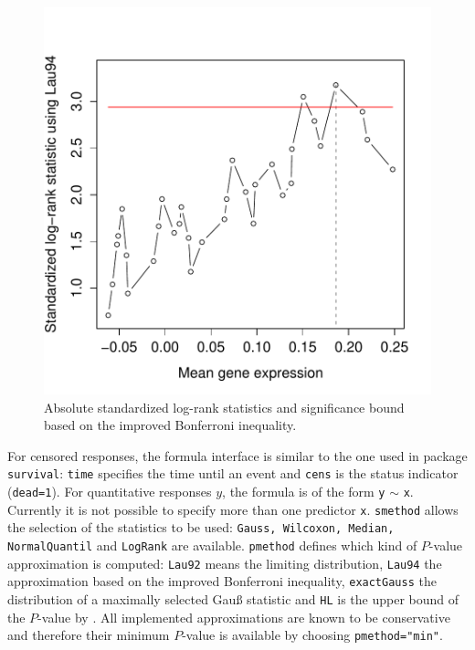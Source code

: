 \documentclass{article}
\renewcommand{\baselinestretch}{1.5}
\begin{document}
\begin{figure}[t]
\begin{center}   
\includegraphics{maxstat-DLBCL-fig}
\caption{Absolute standardized log-rank statistics and 
significance bound based on the
improved Bonferroni inequality. \label{stat}}
\end{center}
\end{figure}

\normalsize
\renewcommand{\baselinestretch}{1.5}

For censored responses, the formula interface is similar to the one 
used in package
\texttt{survival}: \texttt{time} specifies the time until an event and
\texttt{cens} is the status indicator (\texttt{dead=1}). For quantitative
responses $y$, the formula is of the form \texttt{y} $ \sim$ \texttt{x}. 
Currently it is not possible to specify more than one predictor \texttt{x}. 
\texttt{smethod} allows the selection of the statistics to be used:
\texttt{Gauss, Wilcoxon, Median, NormalQuantil} and \texttt{LogRank} are
available.
\texttt{pmethod} defines which kind of $P$-value approximation is computed: 
\texttt{Lau92} means the
limiting distribution, \texttt{Lau94} the approximation based on the improved
Bonferroni inequality, \texttt{exactGauss} the distribution of a maximally
selected Gau{\ss} statistic and \texttt{HL} is 
the upper bound of the $P$-value by
\cite{on-the-exa:2001}. All implemented approximations are known to be
conservative and therefore their minimum $P$-value is available by choosing
\texttt{pmethod="min"}. 
\end{document}
